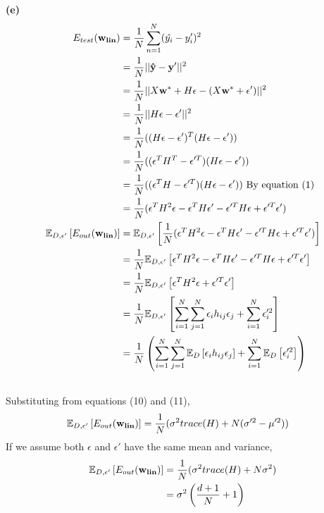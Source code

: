 \documentclass[12pt]{article}
\newcommand{\e}[0]{\epsilon}
\newcommand{\E}[0]{\epsilon}
\begin{document}
\textbf{(e)}
\begin{align}\nonumber
    E_{test}({\bf w_{lin}}) & = \frac{1}{N} \sum_{n=1}^N (\hat{y_i} - y'_i)^2 \\ \nonumber
    & = \frac{1}{N} ||{\bf \hat{y}} - {\bf y'}||^2 \\ \nonumber
    & = \frac{1}{N}||X{\bf w^*} + {H}\e - (X{\bf w^*} + \e')||^2 \\ \nonumber
    & = \frac{1}{N}||{H}\e - \e'||^2 \\ \nonumber
    & = \frac{1}{N}(({H}\e - \e')^T({H}\e - \e')) \\ \nonumber
    & = \frac{1}{N}((\e^TH^T - \e'^T)({H}\e - \e')) \\ \nonumber
    & = \frac{1}{N}((\e^TH - \e'^T)({H}\e - \e')) \text{ By equation (1)} \\ \nonumber
    & = \frac{1}{N}(\E^TH^2\E - \E^TH\E' - \E'^TH\E + \E'^T\E')\\ \nonumber
    \mathbb{E}_{D,\E'}\left[ E_{out}({\bf w_{lin}})\right] & = \mathbb{E}_{D,\E'} \left[ \frac{1}{N} (\E^TH^2\E - \E^TH\E' - \E'^TH\E + \E'^T\E') \right] \\ \nonumber
    & = \frac{1}{N} \mathbb{E}_{D,\E'} \left[ \E^TH^2\E - \E^TH\E' - \E'^TH\E + \E'^T\E' \right] \\ \nonumber
    & = \frac{1}{N} \mathbb{E}_{D,\E'} \left[ \E^TH^2\E  + \E'^T\E' \right] \\ \nonumber
    & = \frac{1}{N} \mathbb{E}_{D,\E'} \left[ \sum_{i=1}^N\sum_{j=1}^N\e_ih_{ij}\e_j + \sum_{i=1}^N\e_i'^2\right] \\ \nonumber
    & = \frac{1}{N} \left( \sum_{i=1}^N\sum_{j=1}^N\mathbb{E}_{D}\left[\e_ih_{ij}\e_j\right] + \sum_{i=1}^N\mathbb{E}_{D}\left[\e_i'^2\right]\right) \\ \nonumber
\end{align}
Substituting from equations (10) and (11),
\begin{align} \nonumber
    \mathbb{E}_{D,\E'}\left[ E_{out}({\bf w_{lin}})\right] & = \frac{1}{N}(\sigma^2trace(H) + N(\sigma'^2-\mu'^2)) \nonumber
\end{align}
If we assume both \(\e\) and \(\e'\) have the same mean and variance,
\begin{align} \nonumber
    \mathbb{E}_{D,\E'}\left[ E_{out}({\bf w_{lin}})\right] & = \frac{1}{N}(\sigma^2trace(H) + N\sigma^2)\\ \nonumber
    & = \sigma^2 \left( \frac{d+1}{N} + 1 \right) 
\end{align}

\end{document}
